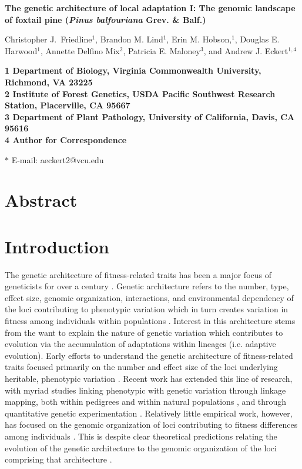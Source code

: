 \documentclass[11pt]{article}
\begin{document}
\begin{flushleft} 
\singlespacing
{\Large \textbf{The genetic architecture of local adaptation I: The genomic landscape of 
foxtail pine (\textit{Pinus balfouriana} Grev. \& Balf.)}}
\null

Christopher J.\ Friedline$^{1}$, 
Brandon M. Lind$^{1}$,
Erin M. Hobson,$^{1}$,
Douglas E. Harwood$^{1}$, 
Annette Delfino Mix$^{2}$,
Patricia E. Maloney$^{3}$, and
Andrew J. Eckert$^{1,4}$
\null

\bf{1} Department of Biology, Virginia Commonwealth University, Richmond, VA 23225
\\
\bf{2} Institute of Forest Genetics, USDA Pacific Southwest Research Station, Placerville, 
CA 95667
\\
\bf{3} Department of Plant Pathology, University of California, Davis, CA 95616
\\
\bf{4} Author for Correspondence
\null

$\ast$ E-mail: aeckert2@vcu.edu
\end{flushleft}

\section*{Abstract}\label{s:abstract}

\section*{Introduction}\label{s:introduction}

The genetic architecture of fitness-related traits has been a major focus of geneticists for 
over a century \citep[reviewed by][]{Ellegren:2008}. Genetic architecture refers to the number, type, effect size, genomic organization, 
interactions, and environmental dependency of the loci contributing to phenotypic variation 
which in turn creates variation in fitness among individuals within populations \citep[cf.][]{Eckert:2012a}. 
Interest in this architecture stems from the want to explain the nature of genetic variation which 
contributes to evolution via the accumulation of adaptations within lineages (i.e. adaptive evolution).
Early efforts to understand the genetic architecture of fitness-related traits
focused primarily on the number and effect size of the loci underlying heritable, phenotypic variation \citep{Fisher:1930}. 
Recent work has extended this line of research, with myriad studies linking phenotypic with genetic variation 
through linkage mapping, both within pedigrees \citep{Mauricio:2001, Neale:2011, Ritland:2011} and within 
natural populations \citep{Ingvarsson:2011, Eckert:2013a}, 
and through quantitative genetic experimentation \citep{Anderson:2013a, Anderson:2013b, Fournier-Level:2013}. Relatively 
little empirical work, however, has focused on the genomic organization of loci contributing to fitness differences 
among individuals \citep[but see][]{Stevison:2011}. This is despite clear theoretical predictions relating the evolution of 
the genetic architecture to the genomic organization of the loci comprising that architecture 
\citep{Kirkpatrick:2006, Yeaman:2011, Yeaman:2013}.
\end{document}
